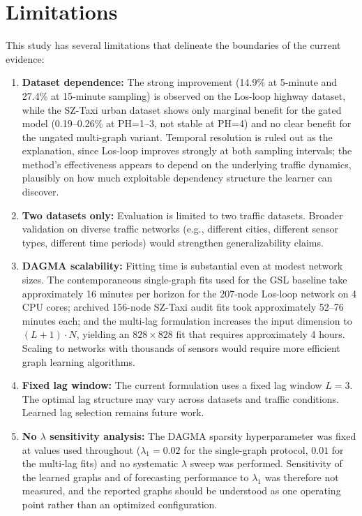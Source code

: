\section{Limitations}\label{sec:limitations}

This study has several limitations that delineate the boundaries of the current evidence:

\begin{enumerate}
    \item \textbf{Dataset dependence:} The strong improvement (14.9\% at 5-minute and 27.4\% at 15-minute sampling) is observed on the Los-loop highway dataset, while the SZ-Taxi urban dataset shows only marginal benefit for the gated model (0.19--0.26\% at PH=1--3, not stable at PH=4) and no clear benefit for the ungated multi-graph variant. Temporal resolution is ruled out as the explanation, since Los-loop improves strongly at both sampling intervals; the method's effectiveness appears to depend on the underlying traffic dynamics, plausibly on how much exploitable dependency structure the learner can discover.

    \item \textbf{Two datasets only:} Evaluation is limited to two traffic datasets. Broader validation on diverse traffic networks (e.g., different cities, different sensor types, different time periods) would strengthen generalizability claims.

    \item \textbf{DAGMA scalability:} Fitting time is substantial even at modest network sizes. The contemporaneous single-graph fits used for the GSL baseline take approximately 16 minutes per horizon for the 207-node Los-loop network on 4 CPU cores; archived 156-node SZ-Taxi audit fits took approximately 52--76 minutes each; and the multi-lag formulation increases the input dimension to $(L+1) \cdot N$, yielding an $828 \times 828$ fit that requires approximately 4 hours. Scaling to networks with thousands of sensors would require more efficient graph learning algorithms.

    \item \textbf{Fixed lag window:} The current formulation uses a fixed lag window $L=3$. The optimal lag structure may vary across datasets and traffic conditions. Learned lag selection remains future work.

    \item \textbf{No $\lambda$ sensitivity analysis:} The DAGMA sparsity hyperparameter was fixed at values used throughout ($\lambda_1 = 0.02$ for the single-graph protocol, $0.01$ for the multi-lag fits) and no systematic $\lambda$ sweep was performed. Sensitivity of the learned graphs and of forecasting performance to $\lambda_1$ was therefore not measured, and the reported graphs should be understood as one operating point rather than an optimized configuration.


\end{enumerate}
